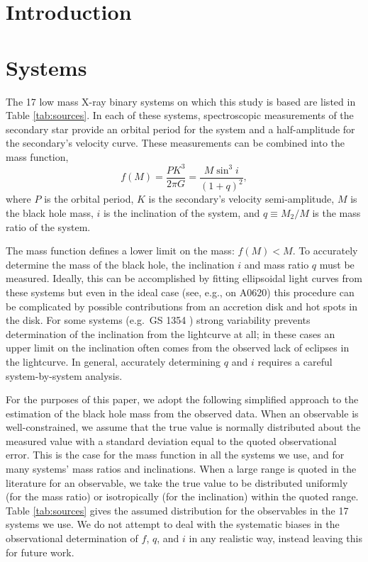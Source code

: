 \documentclass[preprint]{aastex}
\begin{document}
\maketitle

\section{Introduction}
\label{sec:intro}

\section{Systems}
\label{sec:systems}

The 17 low mass X-ray binary systems on which this study is based are
listed in Table \ref{tab:sources}.  In each of these systems,
spectroscopic measurements of the secondary star provide an orbital
period for the system and a half-amplitude for the secondary's
velocity curve.  These measurements can be combined into the mass
function,
\begin{equation}
  \label{eq:mass-function}
  f(M) = \frac{P K^3}{2\pi G} = \frac{M \sin^3 i}{\left( 1 + q \right)^2},
\end{equation}
where $P$ is the orbital period, $K$ is the secondary's velocity
semi-amplitude, $M$ is the black hole mass, $i$ is the inclination of
the system, and $q \equiv M_2 / M$ is the mass ratio of the system.

The mass function defines a lower limit on the mass: $f(M) < M$.  To
accurately determine the mass of the black hole, the inclination $i$
and mass ratio $q$ must be measured.  Ideally, this can be
accomplished by fitting ellipsoidal light curves from these systems
but even in the ideal case (see, e.g., \citet{Cantrell2010} on A0620)
this procedure can be complicated by possible contributions from an
accretion disk and hot spots in the disk.  For some systems (e.g.\ GS
1354 \citep{Casares2009}) strong variability prevents determination of
the inclination from the lightcurve at all; in these cases an upper
limit on the inclination often comes from the observed lack of
eclipses in the lightcurve.  In general, accurately determining $q$
and $i$ requires a careful system-by-system analysis.

For the purposes of this paper, we adopt the following simplified
approach to the estimation of the black hole mass from the observed
data.  When an observable is well-constrained, we assume that the true
value is normally distributed about the measured value with a standard
deviation equal to the quoted observational error.  This is the case
for the mass function in all the systems we use, and for many systems'
mass ratios and inclinations.  When a large range is quoted in the
literature for an observable, we take the true value to be distributed
uniformly (for the mass ratio) or isotropically (for the inclination)
within the quoted range.  Table \ref{tab:sources} gives the assumed
distribution for the observables in the 17 systems we use.  We do not
attempt to deal with the systematic biases in the observational
determination of $f$, $q$, and $i$ in any realistic way, instead
leaving this for future work.
\end{document}
